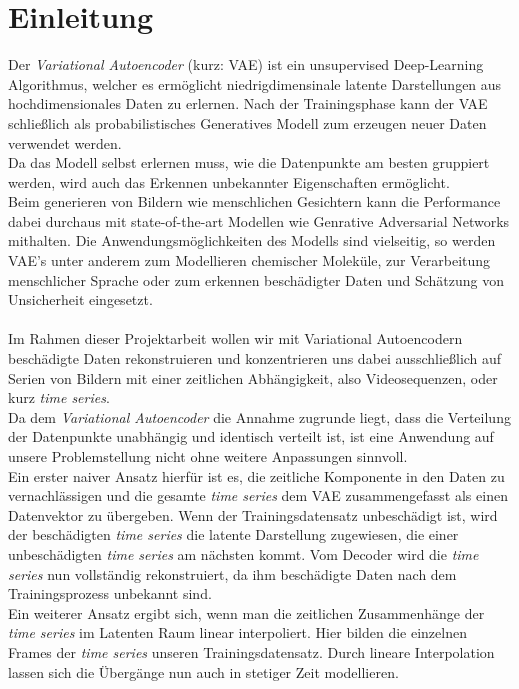 \documentclass[12pt]{article}
\begin{document}
	\section[Einleitung]{Einleitung}
	Der \emph{Variational Autoencoder} (kurz: VAE) ist ein unsupervised Deep-Learning Algorithmus, welcher es ermöglicht niedrigdimensinale latente Darstellungen aus hochdimensionales Daten zu erlernen. Nach der Trainingsphase kann der VAE schließlich als probabilistisches Generatives Modell zum erzeugen neuer Daten verwendet werden.\\
	Da das Modell selbst erlernen muss,
	wie die Datenpunkte am besten gruppiert werden, wird auch das Erkennen unbekannter Eigenschaften ermöglicht.\\ 
	Beim generieren von Bildern wie menschlichen Gesichtern kann die Performance dabei durchaus mit state-of-the-art Modellen wie Genrative Adversarial Networks mithalten. Die Anwendungsmöglichkeiten des Modells sind vielseitig, so werden VAE's unter anderem zum Modellieren chemischer Moleküle, zur Verarbeitung menschlicher Sprache oder zum erkennen beschädigter Daten und Schätzung von Unsicherheit eingesetzt.\\ \\
	Im Rahmen dieser Projektarbeit wollen wir mit Variational Autoencodern beschädigte Daten rekonstruieren und konzentrieren uns dabei ausschließlich auf Serien von Bildern mit einer zeitlichen Abhängigkeit, also Videosequenzen, oder kurz \emph{time series}. \\
	Da dem \emph{Variational Autoencoder} die Annahme zugrunde liegt, dass die Verteilung der Datenpunkte
	unabhängig und identisch verteilt ist, ist eine Anwendung auf unsere Problemstellung nicht ohne weitere
	Anpassungen sinnvoll.\\
	Ein erster naiver Ansatz hierfür ist es, die zeitliche Komponente in den Daten zu
	vernachlässigen und die gesamte \emph{time series} dem VAE zusammengefasst als einen Datenvektor zu übergeben. Wenn der Trainingsdatensatz unbeschädigt ist, wird der beschädigten \emph{time series} die latente Darstellung zugewiesen, die einer unbeschädigten \emph{time series} am nächsten kommt. Vom Decoder wird die \emph{time series} nun vollständig rekonstruiert, da ihm beschädigte Daten nach dem Trainingsprozess unbekannt sind.\\
	Ein weiterer Ansatz ergibt sich, wenn man die zeitlichen Zusammenhänge der \emph{time series}
	im Latenten Raum linear interpoliert. Hier bilden die einzelnen Frames der \emph{time series} unseren Trainingsdatensatz. Durch lineare Interpolation lassen sich die Übergänge nun auch in stetiger Zeit modellieren. \\ \\
\end{document}
